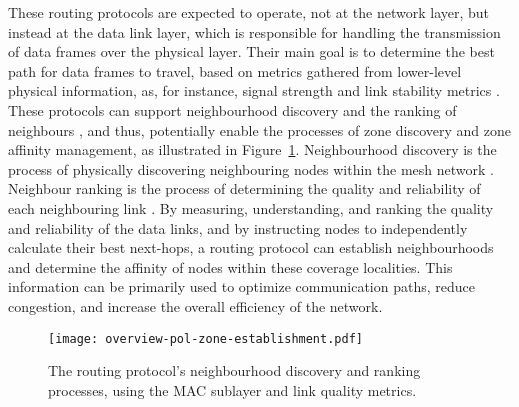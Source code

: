 These routing protocols are expected to operate, not at the network layer, but instead at the data link layer, which is responsible for handling the transmission of data frames over the physical layer. Their main goal is to determine the best path for data frames to travel, based on metrics gathered from lower-level physical information, as, for instance, signal strength and link stability metrics \cite{misra2009guide}. These protocols can support neighbourhood discovery and the ranking of neighbours \cite{batman-adv-v}, and thus, potentially enable the processes of zone discovery and zone affinity management, as illustrated in Figure~\ref{fig:proof-of-location-overview-pol-zone-establishment}. Neighbourhood discovery is the process of physically discovering neighbouring nodes within the mesh network \cite{open-mesh-ogmv2}. Neighbour ranking is the process of determining the quality and reliability of each neighbouring link \cite{seither2011routing}. By measuring, understanding, and ranking the quality and reliability of the data links, and by instructing nodes to independently calculate their best next-hops, a routing protocol can establish neighbourhoods and determine the affinity of nodes within these coverage localities. This information can be primarily used to optimize communication paths, reduce congestion, and increase the overall efficiency of the network.

\begin{figure}[h!]
    \begin{center}
    \texttt{[image: overview-pol-zone-establishment.pdf]}
    \caption{The routing protocol's neighbourhood discovery and ranking processes, using the MAC sublayer and link quality metrics.}
    \label{fig:proof-of-location-overview-pol-zone-establishment}
    \end{center}
\end{figure}

